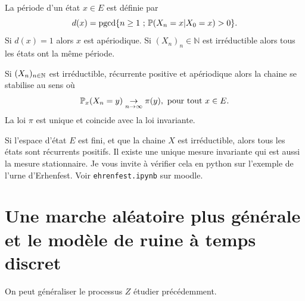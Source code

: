 \begin{definition}
La période d'un état $x\in E$ est définie par 
$$
d(x) = \text{pgcd}\{n\geq 1\text{ ; }\mathbb{P}(X_n=x|X_0 = x)>0\}.
$$
Si $d(x) = 1$ alors $x$ est apériodique. Si $(X_n)_n\in\mathbb{N}$ est irréductible alors tous les états ont la même période. 
\end{definition}

\begin{theo}
Si $(X_n)_{n\in\mathbb{N}}$ est irréductible, récurrente positive et apériodique alors la chaine se stabilise au sens où
$$
\mathbb{P}_x(X_n = y)\underset{n\rightarrow \infty}{\rightarrow} \pi(y),\text{ pour tout }x\in E.
$$
La loi $\pi$ est unique et coincide avec la loi invariante. 
\end{theo}

\begin{remark}
Si l'espace d'état $E$ est fini, et que la chaine $X$ est irréductible, alors tous les états sont récurrents positifs. Il existe une unique mesure invariante qui est aussi la mesure stationnaire. Je vous invite à vérifier cela en python sur l'exemple de l'urne d'Erhenfest. Voir \texttt{ehrenfest.ipynb} sur moodle.
\end{remark}


\section{Une marche aléatoire plus générale et le modèle de ruine à temps discret}\label{sec:ruin_discret}
On peut généraliser le processus $Z$ étudier précédemment. 
